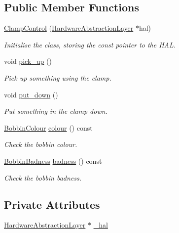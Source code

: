 \subsection*{Public Member Functions}
\begin{DoxyCompactItemize}
\item 
\hyperlink{classIDP_1_1ClampControl_a0359cb52415c35a06521d1130e4f0795}{ClampControl} (\hyperlink{classIDP_1_1HardwareAbstractionLayer}{HardwareAbstractionLayer} $\ast$hal)
\begin{DoxyCompactList}\small\item\em Initialise the class, storing the const pointer to the HAL. \item\end{DoxyCompactList}\item 
void \hyperlink{classIDP_1_1ClampControl_a881ecc4fbc73c47594ecc675b9dbf3e1}{pick\_\-up} ()
\begin{DoxyCompactList}\small\item\em Pick up something using the clamp. \item\end{DoxyCompactList}\item 
void \hyperlink{classIDP_1_1ClampControl_a31573846d9f7c61a6133b9dd465eca25}{put\_\-down} ()
\begin{DoxyCompactList}\small\item\em Put something in the clamp down. \item\end{DoxyCompactList}\item 
\hyperlink{namespaceIDP_a6efd2cca14c0dae1c6458714ce0218df}{BobbinColour} \hyperlink{classIDP_1_1ClampControl_adcb72d77aa298264c67b42e9252f7688}{colour} () const 
\begin{DoxyCompactList}\small\item\em Check the bobbin colour. \item\end{DoxyCompactList}\item 
\hyperlink{namespaceIDP_adf12b2c1e1c228810b18c34a3c88c32d}{BobbinBadness} \hyperlink{classIDP_1_1ClampControl_ab9431b1477cb0785194ed1cfe0b8b328}{badness} () const 
\begin{DoxyCompactList}\small\item\em Check the bobbin badness. \item\end{DoxyCompactList}\end{DoxyCompactItemize}
\subsection*{Private Attributes}
\begin{DoxyCompactItemize}
\item 
\hyperlink{classIDP_1_1HardwareAbstractionLayer}{HardwareAbstractionLayer} $\ast$ \hyperlink{classIDP_1_1ClampControl_ac0c31fdbef30bc0c0d729843c8874475}{\_\-hal}
\end{DoxyCompactItemize}



